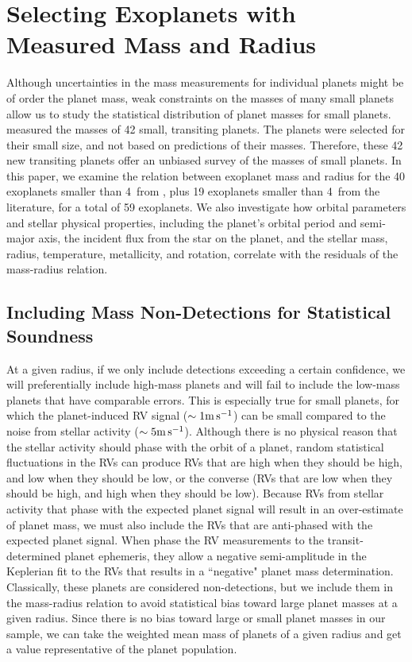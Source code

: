 \documentclass[iop]{emulateapj}
\begin{document}
\section{Selecting Exoplanets with Measured Mass and Radius}
Although uncertainties in the mass measurements for individual planets might be of order the planet mass, weak constraints on the masses of many small planets allow us to study the statistical distribution of planet masses for small planets.  \citet{Marcy2013} measured the masses of 42 small, transiting planets.  The planets were selected for their small size, and not based on predictions of their masses.  Therefore, these 42 new transiting planets offer an unbiased survey of the masses of small planets.  In this paper, we examine the relation between exoplanet mass and radius for the 40 exoplanets smaller than 4\rearth\ from \citet{Marcy2013}, plus 19 exoplanets smaller than 4\rearth\ from the literature, for a total of 59 exoplanets.  We also investigate how orbital parameters and stellar physical properties, including the planet's orbital period and semi-major axis, the incident flux from the star on the planet, and the stellar mass, radius, temperature, metallicity, and rotation, correlate with the residuals of the mass-radius relation.

\subsection{Including Mass Non-Detections for Statistical Soundness}
At a given radius, if we only include detections exceeding a certain confidence, we will preferentially include high-mass planets and will fail to include the low-mass planets that have comparable errors.  This is especially true for small planets, for which the planet-induced RV signal ($\sim1\rm m\,s^{-1}$) can be small compared to the noise from stellar activity ($\sim5\rm m\,s^{-1}$).  Although there is no physical reason that the stellar activity should phase with the orbit of a planet, random statistical fluctuations in the RVs can produce RVs that are high when they should be high, and low when they should be low, or the converse (RVs that are low when they should be high, and high when they should be low).  Because RVs from stellar activity that phase with the expected planet signal will result in an over-estimate of planet mass, we must also include the RVs that are anti-phased with the expected planet signal.  When \citet{Marcy2013} phase the RV measurements to the transit-determined planet ephemeris, they allow  a negative semi-amplitude in the Keplerian fit to the RVs that results in a ``negative" planet mass determination.  Classically, these planets are considered non-detections, but we include them in the mass-radius relation to avoid statistical bias toward large planet masses at a given radius.  Since there is no bias toward large or small planet masses in our sample, we can take the weighted mean mass of planets of a given radius and get a value representative of the planet population.
\end{document}
